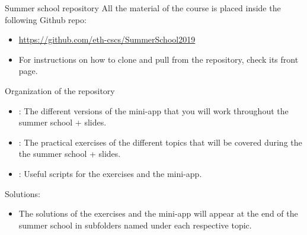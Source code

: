 \begin{frame}{Summer school repository}
  All the material of the course is placed inside the following Github repo:
  \begin{itemize}
  \item \url{https://github.com/eth-cscs/SummerSchool2019}
  \item For instructions on how to clone and pull from the repository, check
    its front page.
  \end{itemize}
  \vfill
  Organization of the repository
  \begin{itemize}
  \item {}: The different versions of the mini-app that you
    will work throughout the summer school + slides.
  \item {}: The practical exercises of the different topics
    that will be covered during the the summer school + slides.
  \item {}: Useful scripts for the exercises and the mini-app.
  \end{itemize}
  \vfill
  Solutions:
  \begin{itemize}
  \item The solutions of the exercises and the mini-app will appear at the end
    of the summer school in subfolders named  under each
    respective topic.
  \end{itemize}
\end{frame}
